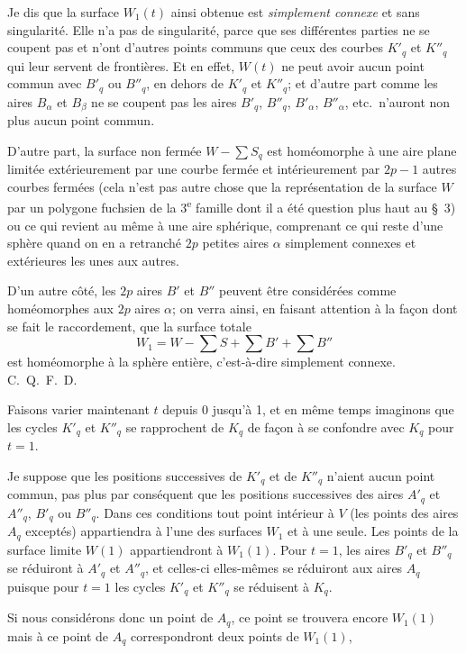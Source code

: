 \documentclass{article}
\begin{document}
Je dis que la surface $W_{1}(t)$ ainsi obtenue est \emph{simplement connexe} et sans singularité. Elle n'a pas de singularité, parce que ses différentes parties ne se coupent pas et n'ont d'autres points communs que ceux des courbes $K'_{q}$ et $K''_{q}$ qui leur servent de frontières. Et en effet, $W(t)$ ne peut avoir aucun point commun avec $B'_{q}$ ou $B''_{q}$, en dehors de $K'_{q}$ et $K''_{q}$; et d'autre part comme les aires $B_{\alpha}$ et $B_{\beta}$ ne se coupent pas les aires $B'_{q}$, $B''_{q}$, $B'_{\alpha}$, $B''_{\alpha}$, etc.\ n'auront non plus aucun point commun.

D'autre part, la surface non fermée $W - \displaystyle\sum S_{q}$ est homéomorphe à une aire plane limitée extérieurement par une courbe fermée et intérieurement par $2p - 1$ autres courbes fermées (cela n'est pas autre chose que la représentation de la surface $W$ par un polygone fuchsien de la 3\textsuperscript{e} famille dont il a été question plus haut au \S~3) ou ce qui revient au même à une aire sphérique, comprenant ce qui reste d'une sphère quand on en a retranché $2p$ petites aires $\alpha$ simplement connexes et extérieures les unes aux autres.

D'un autre côté, les $2p$ aires $B'$ et $B''$ peuvent être considérées comme homéomorphes aux $2p$ aires $\alpha$; on verra ainsi, en faisant attention à la façon dont se fait le raccordement, que la surface totale
\[ W_{1} = W - \sum S + \sum B' + \sum B'' \]
est homéomorphe à la sphère entière, c'est-à-dire simplement connexe. C.~Q.~F.~D.

Faisons varier maintenant $t$ depuis 0 jusqu'à 1, et en même temps imaginons que les cycles $K'_{q}$ et $K''_{q}$ se rapprochent de $K_{q}$ de façon à se confondre avec $K_{q}$ pour $t = 1$.

Je suppose que les positions successives de $K'_{q}$ et de $K''_{q}$ n'aient aucun point commun, pas plus par conséquent que les positions successives des aires $A'_{q}$ et $A''_{q}$, $B'_{q}$ ou $B''_{q}$. Dans ces conditions tout point intérieur à $V$ (les points des aires $A_{q}$ exceptés) appartiendra à l'une des surfaces $W_{1}$ et à une seule. Les points de la surface limite $W(1)$ appartiendront à $W_{1}(1)$. Pour $t = 1$, les aires $B'_{q}$ et $B''_{q}$ se réduiront à $A'_{q}$ et $A''_{q}$, et celles-ci elles-mêmes se réduiront aux aires $A_{q}$ puisque pour $t = 1$ les cycles $K'_{q}$ et $K''_{q}$ se réduisent à $K_{q}$.

Si nous considérons donc un point de $A_{q}$, ce point se trouvera encore $W_{1}(1)$ mais à ce point de $A_{q}$ correspondront deux points de $W_{1}(1)$,
\end{document}
